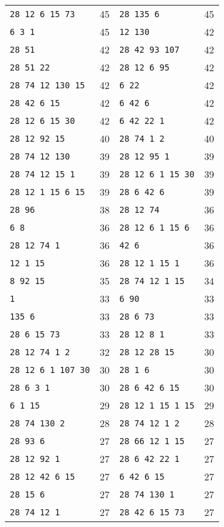 \documentclass[letterpaper]{article} %
\begin{document}
\begin{table}[th]
\begin{tabular}{lclc}
\verb|28 12 6 15 73| & 45 & \verb|28 135 6| & 45 \\
\verb|6 3 1| & 45 & \verb|12 130| & 42 \\
\verb|28 51| & 42 & \verb|28 42 93 107| & 42 \\
\verb|28 51 22| & 42 & \verb|28 12 6 95| & 42 \\
\verb|28 74 12 130 15| & 42 & \verb|6 22| & 42 \\
\verb|28 42 6 15| & 42 & \verb|6 42 6| & 42 \\
\verb|28 12 6 15 30| & 42 & \verb|6 42 22 1| & 42 \\
\verb|28 12 92 15| & 40 & \verb|28 74 1 2| & 40 \\
\verb|28 74 12 130| & 39 & \verb|28 12 95 1| & 39 \\
\verb|28 74 12 15 1| & 39 & \verb|28 12 6 1 15 30| & 39 \\
\verb|28 12 1 15 6 15| & 39 & \verb|28 6 42 6| & 39 \\
\verb|28 96| & 38 & \verb|28 12 74| & 36 \\
\verb|6 8| & 36 & \verb|28 12 6 1 15 6| & 36 \\
\verb|28 12 74 1| & 36 & \verb|42 6| & 36 \\
\verb|12 1 15| & 36 & \verb|28 12 1 15 1| & 36 \\
\verb|8 92 15| & 35 & \verb|28 74 12 1 15| & 34 \\
\verb|1| & 33 & \verb|6 90| & 33 \\
\verb|135 6| & 33 & \verb|28 6 73| & 33 \\
\verb|28 6 15 73| & 33 & \verb|28 12 8 1| & 33 \\
\verb|28 12 74 1 2| & 32 & \verb|28 12 28 15| & 30 \\
\verb|28 12 6 1 107 30| & 30 & \verb|28 1 6| & 30 \\
\verb|28 6 3 1| & 30 & \verb|28 6 42 6 15| & 30 \\
\verb|6 1 15| & 29 & \verb|28 12 1 15 1 15| & 29 \\
\verb|28 74 130 2| & 28 & \verb|28 74 12 1 2| & 28 \\
\verb|28 93 6| & 27 & \verb|28 66 12 1 15| & 27 \\
\verb|28 12 92 1| & 27 & \verb|28 6 42 22 1| & 27 \\
\verb|28 12 42 6 15| & 27 & \verb|6 42 6 15| & 27 \\
\verb|28 15 6| & 27 & \verb|28 74 130 1| & 27 \\
\verb|28 74 12 1| & 27 & \verb|28 42 6 15 73| & 27 \\

\end{tabular}
\end{table}
\end{document}
